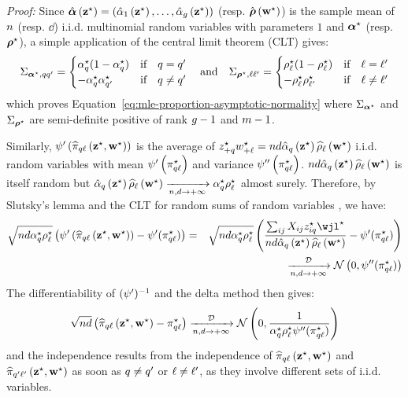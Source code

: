 \documentclass[bj]{imsart}
\numberwithin{equation}{section}
\theoremstyle{plain}
\theoremstyle{remark}
\begin{document}
\textit{Proof:}
Since $\hat{\boldsymbol{\alpha}}\left(\mathbf{z}^\star\right) = \left(\hat{\alpha}_1\left(\mathbf{z}^\star\right), \dots, \hat{\alpha}_g\left(\mathbf{z}^\star\right)\right)$ (resp. $\hat{\boldsymbol{\rho}}\left(\mathbf{w}^\star\right)$) is the sample mean of $n$ (resp. $\dd$) i.i.d. multinomial random variables with parameters $1$ and $\boldsymbol{\alpha}^\star$ (resp. $\boldsymbol{\rho}^\star$), a simple application of the central limit theorem (CLT) gives:
\begin{equation*}
  \Sigma_{\bpis, \kk \kp} =
  \begin{cases}
    \pii^{\vrai}_{\kk}(1 - \pii^{\vrai}_{\kk}) & \text{if} \quad \kk = \kp \\
    -\pii^{\vrai}_{\kk} \pii^{\vrai}_{\kp} & \text{if} \quad \kk \neq \kp \\
  \end{cases}
  \quad \text{and} \quad
  \Sigma_{\brhos, \el \lp} =
  \begin{cases}
    \rhoo^{\vrai}_{\el}(1 - \rhoo^{\vrai}_{\el}) & \text{if} \quad \el = \lp \\
    -\rhoo^{\vrai}_{\el} \rhoo^{\vrai}_{\lp} & \text{if} \quad \el \neq \lp \\
  \end{cases}
\end{equation*}
which proves Equation~\eqref{eq:mle-proportion-asymptotic-normality}
where $\Sigma_{\boldsymbol{\alpha}^\star}$ and $\Sigma_{\boldsymbol{\rho}^\star}$ are
semi-definite positive of rank $g - 1$ and $m - 1$.

Similarly, $\psi'\left(\widehat{\pi}_{q\ell}\left(\mathbf{z}^\star,\mathbf{w}^\star\right)\right)$ is
the average of $z_{+q}^{\star}w_{+\ell}^{\star} =
nd\hat{\alpha}_q\left(\mathbf{z}^\star\right)\widehat{\rho}_\ell\left(\mathbf{w}^\star\right)$
i.i.d. random variables with mean
$\psi'\left(\pi^\star_{q\ell}\right)$ and variance
$\psi''\left(\pi^\star_{q\ell}\right)$. $nd\hat{\alpha}_q\left(\mathbf{z}^\star\right)\widehat{\rho}_\ell\left(\mathbf{w}^\star\right)$
is itself random but
\mbox{$\hat{\alpha}_q\left(\mathbf{z}^\star\right)\widehat{\rho}_\ell\left(\mathbf{w}^\star\right)
  \xrightarrow[n,d \to +\infty]{} \alpha^\star_{q}
  \rho^\star_{\ell}$} almost surely. Therefore, by Slutsky's lemma and
the CLT for random sums of random variables \cite{Shanthikumar1984}, we have:
\begin{eqnarray*}
\sqrt{\n\dd\pii^\star_{\kk}\rhoo^\star_{\el}} \left(\normp\left(\hal_{\kk\el}\left(\bzs,\bws\right)\right) - \normp(\al^\vrai_{\kk\el}) \right)  &=& \sqrt{\n\dd\pii^\star_{\kk}\rhoo^\star_{\el}} \left( \frac{\sum_{\ii\jj} \Xij \zik^{\vrai} \wjl^{\vrai}}{nd\hpi_\kk\left(\bzs\right)\hrho_\el\left(\bws\right)} - \normp(\al^\vrai_{\kk\el}) \right) \\
&& \xrightarrow[\n,\dd \to +\infty]{\mathcal{D}} \mcN\left(0, \normp'(\al^\vrai_{\kk\el})\right)
\end{eqnarray*}
The differentiability of $(\psi')^{-1}$ and the delta method then gives:
\begin{equation*}
  \sqrt{\n\dd} \left(\hal_{\kk\el}\left(\bzs,\bws\right) - \al^\vrai_{\kk\el} \right) \xrightarrow[\n,\dd \to +\infty]{\mathcal{D}} \mcN\left(0, \frac{1}{\pii^\star_{\kk}\rhoo^\star_{\el} \normp'(\al^\vrai_{\kk\el})}\right)
\end{equation*}
and the independence results from the independence of $\widehat{\pi}_{q\ell}\left(\mathbf{z}^\star,\mathbf{w}^\star\right)$ and
$\widehat{\pi}_{q'\ell'}\left(\mathbf{z}^\star,\mathbf{w}^\star\right)$ as soon as $q \neq q'$ or $\ell
\neq \ell'$, as they involve different sets of i.i.d. variables.
\end{document}
